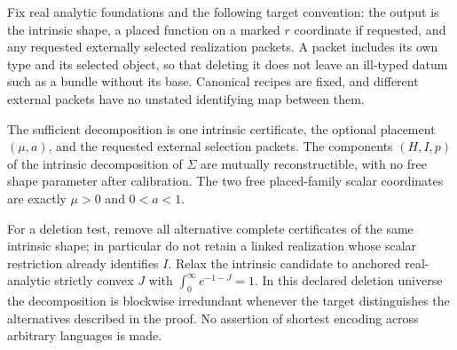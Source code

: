 \begin{theorem}
\label{final:global-C}
\label{final:global-D}
Fix real analytic foundations and the following target convention:
the output is the intrinsic shape, a placed function on a marked $r$
coordinate if requested, and any requested externally selected
realization packets. A packet includes its own type and its selected
object, so that deleting it does not leave an ill-typed datum such as
a bundle without its base. Canonical recipes are fixed, and different
external packets have no unstated identifying map between them.

The sufficient decomposition is one intrinsic certificate, the optional
placement $(\mu,a)$, and the requested external selection packets.
The components $(H,I,p)$ of the intrinsic decomposition of $\Sigma$ are
mutually reconstructible, with no free shape parameter after calibration.
The two free placed-family scalar
coordinates are exactly $\mu>0$ and $0<a<1$.

For a deletion test, remove all alternative complete certificates of the
same intrinsic shape; in particular do not retain a linked realization
whose scalar restriction already identifies $I$. Relax the intrinsic
candidate to anchored real-analytic strictly convex $J$ with
$\int_0^\infty e^{-1-J}=1$. In this declared deletion universe the
decomposition is blockwise irredundant whenever the target distinguishes the
alternatives described in the proof. No assertion of shortest encoding
across arbitrary languages is made.
\end{theorem}
